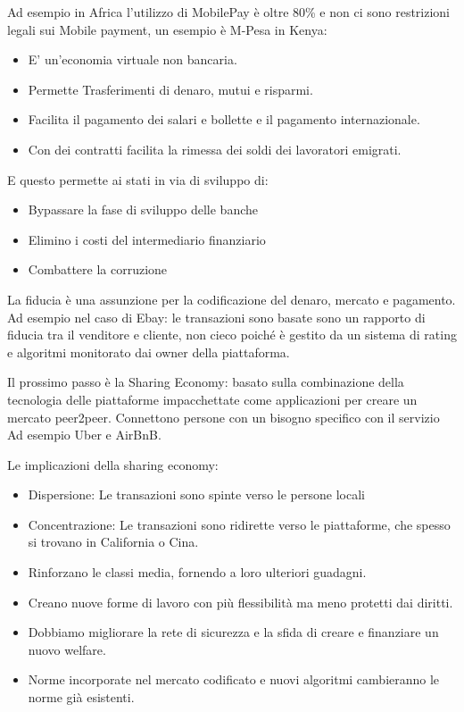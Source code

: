 \documentclass[a4page, 11pt]{article}
\begin{document}
Ad esempio in Africa l’utilizzo di MobilePay è oltre 80\% e non ci sono restrizioni legali sui Mobile payment, un esempio è M-Pesa in Kenya:
\begin{itemize}
	\item E’ un’economia virtuale non bancaria.
	\item Permette Trasferimenti di denaro, mutui e risparmi.
	\item Facilita il pagamento dei salari e bollette e il pagamento internazionale.
	\item Con dei contratti facilita la rimessa dei soldi dei lavoratori emigrati.
\end{itemize}
E questo permette ai stati in via di sviluppo di:
\begin{itemize}
	\item Bypassare la fase di sviluppo delle banche
	\item Elimino i costi del intermediario finanziario
	\item Combattere la corruzione
\end{itemize}
La fiducia è una assunzione per la codificazione del denaro, mercato e pagamento. Ad esempio nel caso di Ebay: le transazioni sono basate sono un rapporto di fiducia tra il venditore e cliente, non cieco poiché è gestito da un sistema di rating e algoritmi monitorato dai owner della piattaforma. 

Il prossimo passo è la Sharing Economy: basato sulla combinazione della tecnologia delle piattaforme impacchettate come applicazioni per creare un mercato peer2peer. Connettono persone con un bisogno specifico con il servizio Ad esempio Uber e AirBnB. 

Le implicazioni della sharing economy:
\begin{itemize}
	\item Dispersione: Le transazioni sono spinte verso le persone locali
	\item Concentrazione: Le transazioni sono ridirette verso le piattaforme, che spesso si trovano in California o Cina.
	\item Rinforzano le classi media, fornendo a loro ulteriori guadagni.
	\item Creano nuove forme di lavoro con più flessibilità ma meno protetti dai diritti.
	\item Dobbiamo migliorare la rete di sicurezza e la sfida di creare e finanziare un nuovo welfare.
	\item Norme incorporate nel mercato codificato e nuovi algoritmi cambieranno le norme già esistenti.
\end{itemize} 
\end{document}
